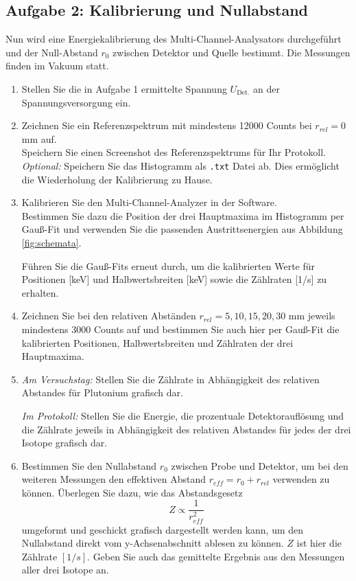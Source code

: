\subsection{Aufgabe 2: Kalibrierung und Nullabstand}
Nun wird eine Energiekalibrierung des Multi-Channel-Analysators durchgeführt und der Null-Abstand $r_0$ zwischen Detektor und Quelle bestimmt. Die Messungen finden im Vakuum statt.

\begin{enumerate}[label=\textbf{\alph*)}]
	\item Stellen Sie die in Aufgabe 1 ermittelte Spannung $U_{\text{Det.}}$ an der Spannungsversorgung ein.
	\item Zeichnen Sie ein Referenzspektrum mit mindestens 12000 Counts bei $r_{rel} = 0$ mm auf.
		\\ Speichern Sie einen Screenshot des Referenzspektrums für Ihr Protokoll.
		\\ \textit{Optional:} Speichern Sie das Histogramm als \verb|.txt| Datei ab. Dies ermöglicht die Wiederholung der Kalibrierung zu Hause. 
	\item Kalibrieren Sie den Multi-Channel-Analyzer in der Software. \\Bestimmen Sie dazu die Position der drei Hauptmaxima im Histogramm per Gauß-Fit und verwenden Sie die passenden Austrittsenergien aus Abbildung \ref{fig:schemata}.
	
	Führen Sie die Gauß-Fits erneut durch, um die kalibrierten Werte für Positionen [keV] und Halbwertsbreiten [keV] sowie die Zählraten [1/s] zu erhalten.
	\item Zeichnen Sie bei den relativen Abständen $r_{rel} = 5, 10, 15, 20, 30$ mm jeweils mindestens 3000 Counts auf und bestimmen Sie auch hier per Gauß-Fit die kalibrierten Positionen, Halbwertsbreiten und Zählraten der drei Hauptmaxima.
	\item \textit{Am Versuchstag:} Stellen Sie die Zählrate in Abhängigkeit des relativen Abstandes für Plutonium grafisch dar.
	
	\textit{Im Protokoll:} Stellen Sie die Energie, die prozentuale Detektorauflösung und die Zählrate  jeweils in Abhängigkeit des relativen Abstandes für jedes der drei Isotope grafisch dar.
	\item Bestimmen Sie den Nullabstand $r_0$ zwischen Probe und Detektor, um bei den weiteren Messungen den effektiven Abstand $r_{eff} = r_0 + r_{rel}$ verwenden zu können. Überlegen Sie dazu, wie das Abstandsgesetz
	\begin{equation}
		Z \propto \frac{1}{r^2_{eff}}
	\end{equation}
	umgeformt und geschickt grafisch dargestellt werden kann, um den Nullabstand direkt vom y-Achsenabschnitt ablesen zu können. $Z$ ist hier die Zählrate $[1/s]$. Geben Sie auch das gemittelte Ergebnis aus den Messungen aller drei Isotope an.


\end{enumerate}
